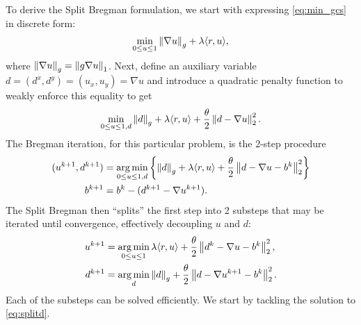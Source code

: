 To derive the Split Bregman formulation, we start with expressing \eqref{eq:min_gcs} in discrete form: 
\begin{align*}
\min_{0\leq u \leq 1} \left\lVert \nabla u \right\rVert_g + \lambda \langle r, u \rangle,
\end{align*}
where $\left\lVert \nabla u \right\rVert_g = \left\lVert g \nabla u\right\rVert_1$. Next, 
define an auxiliary variable $d = (d^x, d^y) = (u_x, u_y) = \nabla u$ and introduce a quadratic penalty function to weakly enforce this equality to get
\begin{align*}
\min_{0\leq u \leq 1, d} 
 \left\lVert d \right\rVert_g + \lambda  \langle r, u \rangle
+ \frac{\theta}{2} \left\lVert d - \nabla u \right\rVert_2^2.
\end{align*} 
The Bregman iteration, for this particular problem, is the 2-step procedure
\begin{align}
(u^{k+1}, d^{k+1}) 
&= \operatorname*{arg\,min}_{0\leq u \leq 1, d}  \left\{\left\lVert d\right\rVert_g + \lambda\langle r, u \rangle + \frac{\theta}{2} \left\lVert d - \nabla u - b^k \right\rVert^2_2 \right\}
\\
b^{k+1} &= b^k - (d^{k+1} - \nabla u^{k+1}) .
\label{eq:sbbij}
\end{align} 
The Split Bregman then ``splits'' the first step into 2 substeps that may be iterated until convergence, effectively decoupling $u$ and $d$: 
\begin{align}
u^{k+1} &= \operatorname*{arg\,min}_{0\leq u \leq 1} \lambda \langle r, u \rangle
+ \frac{\theta}{2} \left\lVert d^k - \nabla u - b^k \right\rVert^2_2,
\label{eq:splitu}
\\
d^{k+1} 
&= \operatorname*{arg\,min}_d \left\lVert d\right\rVert_g + \frac{\theta}{2} \left\lVert d - \nabla u^{k+1} - b^k\right\rVert^2_2.
\label{eq:splitd}
\end{align}
Each of the substeps can be solved efficiently. We start by tackling the solution to \eqref{eq:splitd}.

